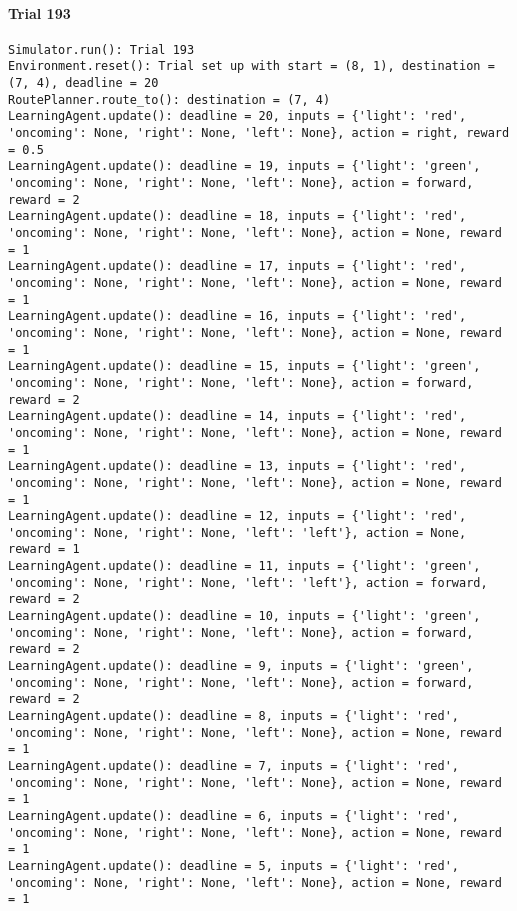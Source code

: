 \documentclass{article}
\begin{document}
\paragraph{Trial 193}\label{trial-193}

\begin{verbatim}
Simulator.run(): Trial 193
Environment.reset(): Trial set up with start = (8, 1), destination = (7, 4), deadline = 20
RoutePlanner.route_to(): destination = (7, 4)
LearningAgent.update(): deadline = 20, inputs = {'light': 'red', 'oncoming': None, 'right': None, 'left': None}, action = right, reward = 0.5
LearningAgent.update(): deadline = 19, inputs = {'light': 'green', 'oncoming': None, 'right': None, 'left': None}, action = forward, reward = 2
LearningAgent.update(): deadline = 18, inputs = {'light': 'red', 'oncoming': None, 'right': None, 'left': None}, action = None, reward = 1
LearningAgent.update(): deadline = 17, inputs = {'light': 'red', 'oncoming': None, 'right': None, 'left': None}, action = None, reward = 1
LearningAgent.update(): deadline = 16, inputs = {'light': 'red', 'oncoming': None, 'right': None, 'left': None}, action = None, reward = 1
LearningAgent.update(): deadline = 15, inputs = {'light': 'green', 'oncoming': None, 'right': None, 'left': None}, action = forward, reward = 2
LearningAgent.update(): deadline = 14, inputs = {'light': 'red', 'oncoming': None, 'right': None, 'left': None}, action = None, reward = 1
LearningAgent.update(): deadline = 13, inputs = {'light': 'red', 'oncoming': None, 'right': None, 'left': None}, action = None, reward = 1
LearningAgent.update(): deadline = 12, inputs = {'light': 'red', 'oncoming': None, 'right': None, 'left': 'left'}, action = None, reward = 1
LearningAgent.update(): deadline = 11, inputs = {'light': 'green', 'oncoming': None, 'right': None, 'left': 'left'}, action = forward, reward = 2
LearningAgent.update(): deadline = 10, inputs = {'light': 'green', 'oncoming': None, 'right': None, 'left': None}, action = forward, reward = 2
LearningAgent.update(): deadline = 9, inputs = {'light': 'green', 'oncoming': None, 'right': None, 'left': None}, action = forward, reward = 2
LearningAgent.update(): deadline = 8, inputs = {'light': 'red', 'oncoming': None, 'right': None, 'left': None}, action = None, reward = 1
LearningAgent.update(): deadline = 7, inputs = {'light': 'red', 'oncoming': None, 'right': None, 'left': None}, action = None, reward = 1
LearningAgent.update(): deadline = 6, inputs = {'light': 'red', 'oncoming': None, 'right': None, 'left': None}, action = None, reward = 1
LearningAgent.update(): deadline = 5, inputs = {'light': 'red', 'oncoming': None, 'right': None, 'left': None}, action = None, reward = 1

\end{verbatim}
\end{document}
